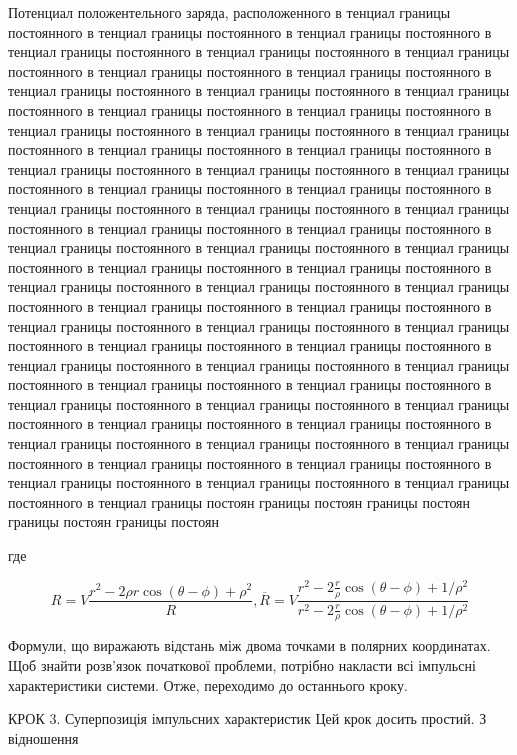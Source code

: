 \documentclass[
  ukrainian,
]{article}
\begin{document}
Потенциал положентельного заряда, расположенного в тенциал границы
постоянного в тенциал границы постоянного в тенциал границы постоянного
в тенциал границы постоянного в тенциал границы постоянного в тенциал
границы постоянного в тенциал границы постоянного в тенциал границы
постоянного в тенциал границы постоянного в тенциал границы постоянного
в тенциал границы постоянного в тенциал границы постоянного в тенциал
границы постоянного в тенциал границы постоянного в тенциал границы
постоянного в тенциал границы постоянного в тенциал границы постоянного
в тенциал границы постоянного в тенциал границы постоянного в тенциал
границы постоянного в тенциал границы постоянного в тенциал границы
постоянного в тенциал границы постоянного в тенциал границы постоянного
в тенциал границы постоянного в тенциал границы постоянного в тенциал
границы постоянного в тенциал границы постоянного в тенциал границы
постоянного в тенциал границы постоянного в тенциал границы постоянного
в тенциал границы постоянного в тенциал границы постоянного в тенциал
границы постоянного в тенциал границы постоянного в тенциал границы
постоянного в тенциал границы постоянного в тенциал границы постоянного
в тенциал границы постоянного в тенциал границы постоянного в тенциал
границы постоянного в тенциал границы постоянного в тенциал границы
постоянного в тенциал границы постоянного в тенциал границы постоянного
в тенциал границы постоянного в тенциал границы постоянного в тенциал
границы постоянного в тенциал границы постоянного в тенциал границы
постоянного в тенциал границы постоянного в тенциал границы постоянного
в тенциал границы постоянного в тенциал границы постоянного в тенциал
границы постоянного в тенциал границы постоянного в тенциал границы
постоянного в тенциал границы постоянного в тенциал границы постоянного
в тенциал границы постоянного в тенциал границы постоянного в тенциал
границы постоян границы постоян границы постоян границы постоян границы
постоян

где

\[
R = V \frac{r^2 - 2\rho r \cos(\theta - \phi) + \rho^2}{R},
\overline{R} = V \frac{r^2 - 2\frac{r}{\rho}\cos(\theta - \phi) + 1/\rho^2}{r^2 - 2\frac{r}{\rho}\cos(\theta - \phi) + 1/\rho^2}
\]

Формули, що виражають відстань між двома точками в полярних координатах.
Щоб знайти розв'язок початкової проблеми, потрібно накласти всі
імпульсні характеристики системи. Отже, переходимо до останнього кроку.

КРОК 3. Суперпозиція імпульсних характеристик Цей крок досить простий. З
відношення
\end{document}
